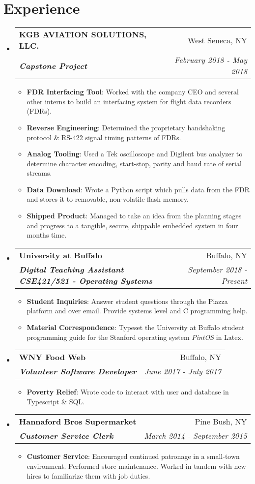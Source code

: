 \documentclass[letterpaper,11pt]{article}
\makeatletter
\newcommand{\resumeItem}[2]{
  \item\small{
    \textbf{#1}{: #2 \vspace{-2pt}}
  }
}
\newcommand{\resumeSubheading}[4]{
  \vspace{-1pt}\item
    \begin{tabular*}{0.97\textwidth}{l@{\extracolsep{\fill}}r}
      \textbf{#1} & #2 \\
      \textit{\small#3} & \textit{\small #4} \\
    \end{tabular*}\vspace{-5pt}
}
\newcommand{\resumeSubHeadingListStart}{\begin{itemize}[leftmargin=*]}
\newcommand{\resumeSubHeadingListEnd}{\end{itemize}}
\newcommand{\resumeItemListStart}{\begin{itemize}}
\newcommand{\resumeItemListEnd}{\end{itemize}\vspace{-5pt}}
\makeatother
\begin{document}
\section{Experience}
  \resumeSubHeadingListStart
  
  
  \resumeSubheading
  {KGB AVIATION SOLUTIONS, LLC.}{West Seneca, NY}
  {\textbf{Capstone Project}}{February 2018 - May 2018}
  \resumeItemListStart

   \resumeItem{FDR Interfacing Tool}{Worked with the company CEO and several other interns to build an interfacing system for flight data recorders (FDRs). }
  \resumeItem{Reverse Engineering}
  {Determined the proprietary handshaking protocol \& RS-422 signal timing patterns of FDRs. }

   \resumeItem{Analog Tooling}{Used a Tek oscilloscope and Digilent bus analyzer to determine character encoding, start-stop, parity and baud rate of serial streams.}
    
  \resumeItem{Data Download}{Wrote a Python script which pulls data from the FDR and stores it to removable, non-volatile flash memory.}
  \resumeItem{Shipped Product}{Managed to take an idea from the planning stages and progress to a tangible, secure, shippable embedded system in four months time.}
 
  \resumeItemListEnd

\resumeSubheading{University at Buffalo}{Buffalo, NY}{ \textbf{Digital Teaching Assistant CSE421/521 - Operating Systems}}{September 2018 - Present}
	\resumeItemListStart
		\resumeItem{Student Inquiries}{Answer student questions through the Piazza platform and over email. Provide systems level  and C programming help.}
		\resumeItem{Material Correspondence}{Typeset the University at Buffalo student programming guide for the Stanford operating system \textit{PintOS} in Latex. }
	\resumeSubHeadingListEnd

	\resumeSubheading
	{WNY Food Web}{Buffalo, NY}
	{\textbf{Volunteer Software Developer}}{June 2017 - July 2017}
	\resumeItemListStart
	\resumeItem{Poverty Relief}
	{Wrote code to interact with user and database in Typescript \& SQL. }
	\resumeItemListEnd
	

       \resumeSubheading
      {Hannaford Bros Supermarket}{Pine Bush, NY}
      {\textbf{Customer Service Clerk}}{March 2014 - September 2015}
      \resumeItemListStart
      \resumeItem{Customer Service}
     {Encouraged continued patronage in a small-town environment. Performed store maintenance. Worked in tandem with new hires to familiarize them with job duties.}
      \resumeItemListEnd
  \resumeSubHeadingListEnd
\end{document}
